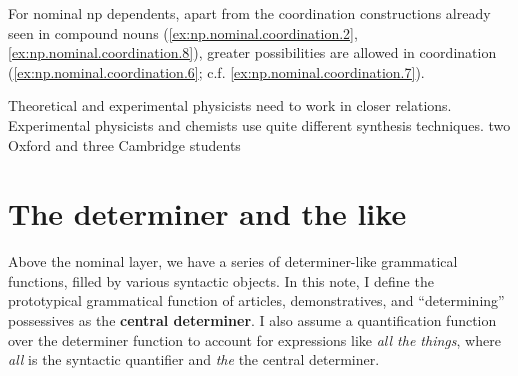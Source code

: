 \documentclass[UTF8, a4paper, oneside, scheme=plain, 12pt]{ctexbook}
\newcommand*{\concept}[1]{\textbf{#1}}
\newcommand{\form}[1]{\emph{#1}}
\begin{document}
For nominal \acs{np} dependents, 
apart from the coordination constructions 
already seen in compound nouns 
(\ref{ex:np.nominal.coordination.2}, 
\ref{ex:np.nominal.coordination.8}),
greater possibilities are allowed in coordination
(\ref{ex:np.nominal.coordination.6}; c.f. \ref{ex:np.nominal.coordination.7}). 

\begin{exe}
    \ex\label{ex:np.nominal.coordination.2} Theoretical and experimental physicists need to work in closer relations.
    \ex\label{ex:np.nominal.coordination.8} Experimental physicists and chemists use 
    quite different synthesis techniques. 
    \ex\label{ex:np.nominal.coordination.6} two Oxford and three Cambridge students 
\end{exe}

\section{The determiner and the like}\label{sec:np.det}

Above the nominal layer, 
we have a series of determiner-like grammatical functions,
filled by various syntactic objects.
In this note, 
I define the prototypical grammatical function of articles, demonstratives, 
and ``determining'' possessives as the \concept{central determiner}.
I also assume a quantification function over the determiner function
to account for expressions like \form{all the things},
where \form{all} is the syntactic quantifier and \form{the} the central determiner.
\end{document}
